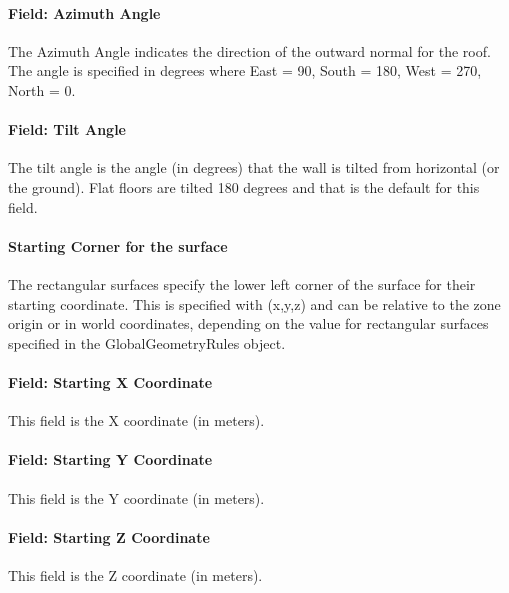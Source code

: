 \paragraph{Field: Azimuth Angle}\label{field-azimuth-angle-7}

The Azimuth Angle indicates the direction of the outward normal for the roof. The angle is specified in degrees where East = 90, South = 180, West = 270, North = 0.

\paragraph{Field: Tilt Angle}\label{field-tilt-angle-7}

The tilt angle is the angle (in degrees) that the wall is tilted from horizontal (or the ground). Flat floors are tilted 180 degrees and that is the default for this field.

\paragraph{Starting Corner for the surface}\label{starting-corner-for-the-surface-7}

The rectangular surfaces specify the lower left corner of the surface for their starting coordinate. This is specified with (x,y,z) and can be relative to the zone origin or in world coordinates, depending on the value for rectangular surfaces specified in the GlobalGeometryRules object.

\paragraph{Field: Starting X Coordinate}\label{field-starting-x-coordinate-7}

This field is the X coordinate (in meters).

\paragraph{Field: Starting Y Coordinate}\label{field-starting-y-coordinate-7}

This field is the Y coordinate (in meters).

\paragraph{Field: Starting Z Coordinate}\label{field-starting-z-coordinate-7}

This field is the Z coordinate (in meters).


